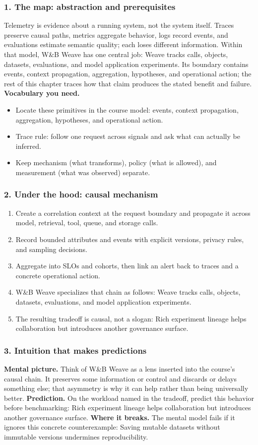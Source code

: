 \subsubsection*{1. The map: abstraction and prerequisites}
Telemetry is evidence about a running system, not the system itself. Traces preserve causal paths, metrics aggregate behavior, logs record events, and evaluations estimate semantic quality; each loses different information.
Within that model, W\&B Weave has one central job: Weave tracks calls, objects, datasets, evaluations, and model application experiments. Its boundary contains events, context propagation, aggregation, hypotheses, and operational action; the rest of this chapter traces how that claim produces the stated benefit and failure.
\textbf{Vocabulary you need.}\begin{itemize}
\item Locate these primitives in the course model: events, context propagation, aggregation, hypotheses, and operational action.
\item Trace rule: follow one request across signals and ask what can actually be inferred.
\item Keep mechanism (what transforms), policy (what is allowed), and measurement (what was observed) separate.
\end{itemize}
\subsubsection*{2. Under the hood: causal mechanism}\begin{enumerate}
\item Create a correlation context at the request boundary and propagate it across model, retrieval, tool, queue, and storage calls.
\item Record bounded attributes and events with explicit versions, privacy rules, and sampling decisions.
\item Aggregate into SLOs and cohorts, then link an alert back to traces and a concrete operational action.
\item W\&B Weave specializes that chain as follows: Weave tracks calls, objects, datasets, evaluations, and model application experiments.
\item The resulting tradeoff is causal, not a slogan: Rich experiment lineage helps collaboration but introduces another governance surface.
\end{enumerate}
\subsubsection*{3. Intuition that makes predictions}
\textbf{Mental picture.} Think of W\&B Weave as a lens inserted into the course's causal chain. It preserves some information or control and discards or delays something else; that asymmetry is why it can help rather than being universally better.
\textbf{Prediction.} On the workload named in the tradeoff, predict this behavior before benchmarking: Rich experiment lineage helps collaboration but introduces another governance surface.
\textbf{Where it breaks.} The mental model fails if it ignores this concrete counterexample: Saving mutable datasets without immutable versions undermines reproducibility.
